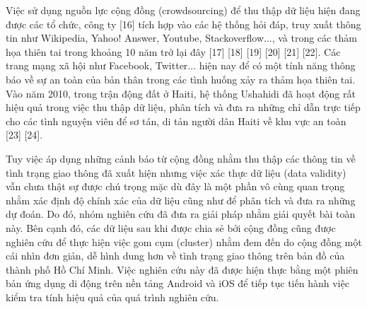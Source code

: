Việc sử dụng nguồn lực cộng đồng (crowdsourcing) để thu thập dữ liệu hiện đang được các tổ chức, công ty [16] tích hợp vào các hệ thống hỏi đáp, truy xuất thông tin như Wikipedia, Yahoo! Answer, Youtube, Stackoverflow..., và trong các thảm họa thiên tai trong khoảng 10 năm trở lại đây [17] [18] [19] [20] [21] [22]. Các trang mạng xã hội như Facebook, Twitter... hiện nay để có một tính năng thông báo về sự an toàn của bản thân trong các tình huống xảy ra thảm họa thiên tai. Vào năm 2010, trong trận động đất ở Haiti, hệ thống Ushahidi đã hoạt động rất hiệu quả trong việc thu thập dữ liệu, phân tích và đưa ra những chỉ dẫn trực tiếp cho các tình nguyện viên để sơ tán, di tản người dân Haiti về khu vực an toàn [23] [24].

Tuy việc áp dụng những cảnh báo từ cộng đồng nhằm thu thập các thông tin về tình trạng giao thông đã xuất hiện nhưng việc xác thực dữ liệu (data validity) vẫn chưa thật sự được chú trọng mặc dù đây là một phần vô cùng quan trọng nhằm xác định độ chính xác của dữ liệu cũng như để phân tích và đưa ra những dự đoán. Do đó, nhóm nghiên cứu đã đưa ra giải pháp nhằm giải quyết bài toàn này. Bên cạnh đó, các dữ liệu sau khi được chia sẻ bởi cộng đồng cũng được nghiên cứu để thực hiện việc gom cụm (cluster) nhằm đem đến do cộng đồng một cái nhìn đơn giản, dễ hình dung hơn về tình trạng giao thông trên bản đồ của thành phố Hồ Chí Minh. Việc nghiên cứu này đã được hiện thực bằng một phiên bản ứng dụng di động trên nền tảng Android và iOS để tiếp tục tiến hành
việc kiểm tra tính hiệu quả của quá trình nghiên cứu.